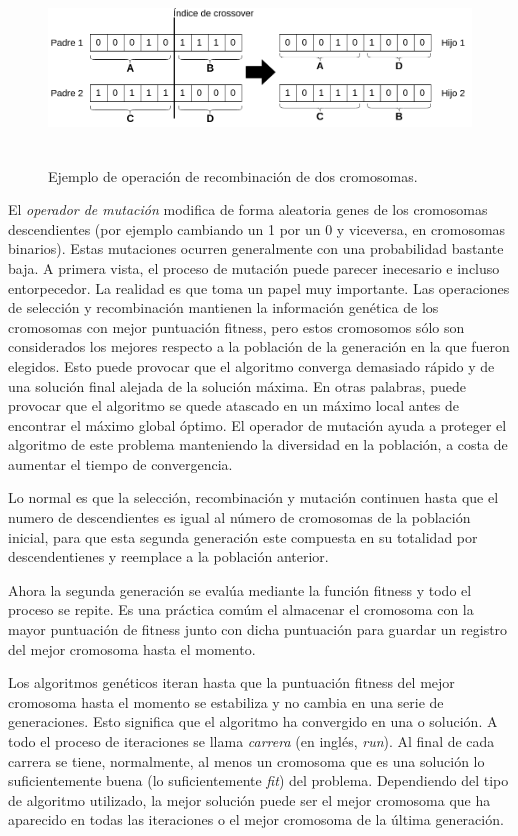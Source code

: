 \begin{figure}[H]
    \centering
    \includegraphics[width=1.0\textwidth,height=5cm]{Imagenes/CrossoverExample}
    \caption{Ejemplo de operación de recombinación de dos cromosomas.}
    \label{fig:figuraCrossover}
\end{figure}

El \textit{operador de mutación} modifica de forma aleatoria genes de los cromosomas descendientes (por ejemplo cambiando un 1 por un 0 y viceversa, en cromosomas binarios). Estas mutaciones ocurren
generalmente con una probabilidad bastante baja. A primera vista, el proceso de mutación puede parecer inecesario e incluso entorpecedor. La realidad es que toma un papel muy importante. Las operaciones
de selección y recombinación mantienen la información genética de los cromosomas con mejor puntuación fitness, pero estos cromosomos sólo son considerados los mejores respecto a la población de la generación
en la que fueron elegidos. Esto puede provocar que el algoritmo converga demasiado rápido y de una solución final alejada de la solución máxima. En otras palabras, puede provocar que el algoritmo se quede
atascado en un máximo local antes de encontrar el máximo global óptimo. El operador de mutación ayuda a proteger el algoritmo de este problema manteniendo la diversidad en la población, a costa de aumentar
el tiempo de convergencia.

Lo normal es que la selección, recombinación y mutación continuen hasta que el numero de descendientes es igual al número de cromosomas de la población inicial, para que esta segunda generación este compuesta
en su totalidad por descendentienes y reemplace a la población anterior.

Ahora la segunda generación se evalúa mediante la función fitness y todo el proceso se repite. Es una práctica comúm el almacenar el cromosoma con la mayor puntuación de fitness junto con dicha puntuación para
guardar un registro del mejor cromosoma hasta el momento.

Los algoritmos genéticos iteran hasta que la puntuación fitness del mejor cromosoma hasta el momento se estabiliza y no cambia en una serie de generaciones. Esto significa que el algoritmo ha convergido en una
o solución. A todo el proceso de iteraciones se llama \textit{carrera} (en inglés, \textit{run}). Al final de cada carrera se tiene, normalmente, al menos un cromosoma que es una solución lo suficientemente
buena (lo suficientemente \textit{fit}) del problema. Dependiendo del tipo de algoritmo utilizado, la mejor solución puede ser el mejor cromosoma que ha aparecido en todas las iteraciones o el mejor cromosoma
de la última generación.

